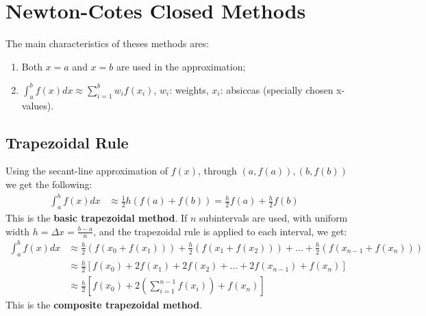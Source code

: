 \section{Newton-Cotes Closed Methods}

	The main characteristics of theses methods ares:
	\begin{enumerate}
		\item{Both $x=a$ and $x=b$ are used in the approximation;}
		\item{$\int_{a}^{b} f(x) dx \approx \sum_{i=1}^{b} w_{i}f(x_{i})$, $w_{i}$: weights, $x_{i}$: absiccas (specially chosen x-values).}
	\end{enumerate}

	\subsection{Trapezoidal Rule}
		Using the secant-line approximation of $f(x)$, through $(a, f(a)),(b,f(b))$ we get the following:
		\begin{align}
			\int_{a}^{b} f(x) dx &\approx \frac{1}{2}h(f(a)+f(b)) = \frac{h}{2}f(a) + \frac{h}{2}f(b)&
		\end{align}
		This is the \textbf{basic trapezoidal method}.
		If $n$ subintervals are used, with uniform width $h = \Delta x = \frac{b-a}{n}$, and the trapezoidal rule is applied to each interval, we get:
		\begin{align}
			\int_{a}^{b} f(x) dx &\approx \frac{h}{2}\left(f(x_{0}+f(x_{1}))\right) + \frac{h}{2}\left(f(x_{1}+f(x_{2}))\right) + \dots +
			\frac{h}{2}\left(f(x_{n-1}+f(x_{n}))\right)& \\
			&\approx \frac{h}{2}\left[f(x_{0})+2f(x_{1})+2f(x_{2})+\dots+2f(x_{n-1})+f(x_{n})\right]& \\
			&\approx \frac{h}{2}\left[f(x_{0})+2\left(\sum_{i=1}^{n-1}f(x_i)\right)+f(x_{n})\right]&
		\end{align}
		This is the \textbf{composite trapezoidal method}.

